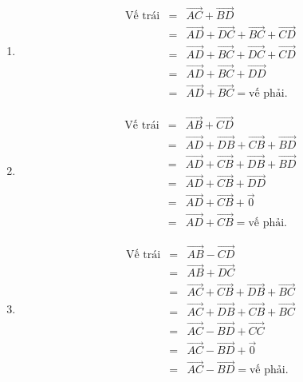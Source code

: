 \begin{bt}
{\begin{enumerate}
\begin{eqnarray*}
				&=&\overrightarrow{AC}+\overrightarrow{CE}+\overrightarrow{EF}\\
				&=&\overrightarrow{AE}+\overrightarrow{EF}\\
				&=&\overrightarrow{AF}=\text{vế phải}.
			\end{eqnarray*}
			\item \begin{eqnarray*}
				\text{Vế trái}
				&=&\overrightarrow{AC}+\overrightarrow{BD}\\
				&=&\overrightarrow{AD}+\overrightarrow{DC}+\overrightarrow{BC}+\overrightarrow{CD}\\
				&=&\overrightarrow{AD}+\overrightarrow{BC}+\overrightarrow{DC}+\overrightarrow{CD}\\
				&=&\overrightarrow{AD}+\overrightarrow{BC}+\overrightarrow{DD}\\
				&=&\overrightarrow{AD}+\overrightarrow{BC}=\text{vế phải}.
			\end{eqnarray*}
			\item \begin{eqnarray*}
				\text{Vế trái}
				&=&\overrightarrow{AB}+\overrightarrow{CD}\\
				&=&\overrightarrow{AD}+\overrightarrow{DB}+\overrightarrow{CB}+\overrightarrow{BD}\\
				&=&\overrightarrow{AD}+\overrightarrow{CB}+\overrightarrow{DB}+\overrightarrow{BD}\\
				&=&\overrightarrow{AD}+\overrightarrow{CB}+\overrightarrow{DD}\\
				&=&\overrightarrow{AD}+\overrightarrow{CB}+\overrightarrow{0}\\
				&=&\overrightarrow{AD}+\overrightarrow{CB}=\text{vế phải}.
			\end{eqnarray*}
			\item \begin{eqnarray*}
				\text{Vế trái}
				&=&\overrightarrow{AB}-\overrightarrow{CD}\\
				&=&\overrightarrow{AB}+\overrightarrow{DC}\\
				&=&\overrightarrow{AC}+\overrightarrow{CB}+\overrightarrow{DB}+\overrightarrow{BC}\\
				&=&\overrightarrow{AC}+\overrightarrow{DB}+\overrightarrow{CB}+\overrightarrow{BC}\\
				&=&\overrightarrow{AC}-\overrightarrow{BD}+\overrightarrow{CC}\\
				&=&\overrightarrow{AC}-\overrightarrow{BD}+\overrightarrow{0}\\
				&=&\overrightarrow{AC}-\overrightarrow{BD}=\text{vế phải}.

\end{eqnarray*}
\end{enumerate}}
\end{bt}
